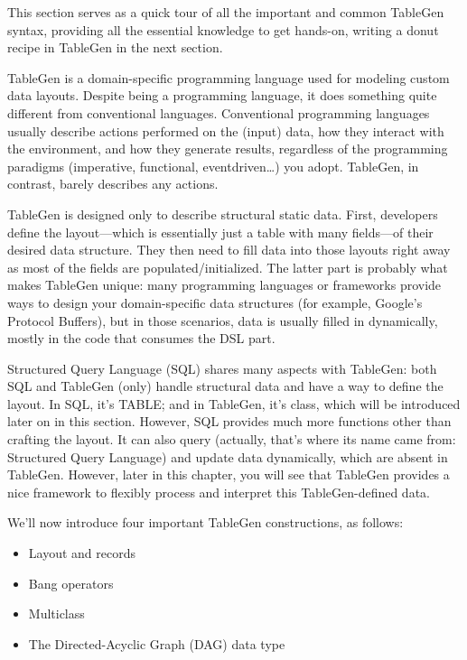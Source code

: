 

This section serves as a quick tour of all the important and common TableGen syntax, providing all the essential knowledge to get hands-on, writing a donut recipe in TableGen in the next section.

TableGen is a domain-specific programming language used for modeling custom data layouts. Despite being a programming language, it does something quite different from conventional languages. Conventional programming languages usually describe actions performed on the (input) data, how they interact with the environment, and how they generate results, regardless of the programming paradigms (imperative, functional, eventdriven…) you adopt. TableGen, in contrast, barely describes any actions.

TableGen is designed only to describe structural static data. First, developers define the layout—which is essentially just a table with many fields—of their desired data structure. They then need to fill data into those layouts right away as most of the fields are populated/initialized. The latter part is probably what makes TableGen unique: many programming languages or frameworks provide ways to design your domain-specific data structures (for example, Google's Protocol Buffers), but in those scenarios, data is usually filled in dynamically, mostly in the code that consumes the DSL part.

Structured Query Language (SQL) shares many aspects with TableGen: both SQL and TableGen (only) handle structural data and have a way to define the layout. In SQL, it's TABLE; and in TableGen, it's class, which will be introduced later on in this section. However, SQL provides much more functions other than crafting the layout. It can also query (actually, that's where its name came from: Structured Query Language) and update data dynamically, which are absent in TableGen. However, later in this chapter, you will see that TableGen provides a nice framework to flexibly process and interpret this TableGen-defined data.

We'll now introduce four important TableGen constructions, as follows:

\begin{itemize}
\item Layout and records
\item Bang operators
\item Multiclass
\item The Directed-Acyclic Graph (DAG) data type
\end{itemize}

